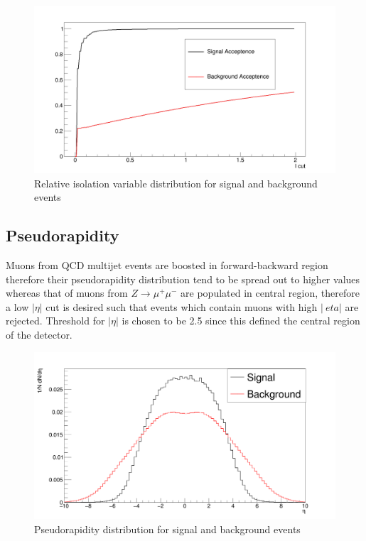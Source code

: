 \documentclass[12pt,a4paper]{article}		%
\begin{document}
\begin{figure}[h]
	\begin{center}
		\includegraphics[scale=0.2]{Iacc.png} 
		\caption{Relative isolation variable distribution for signal and background events} 		
	\end{center}
	\centering	
\end{figure}
		

\newpage			
\subsection{Pseudorapidity}  

Muons from QCD multijet events are boosted in forward-backward region therefore their pseudorapidity distribution tend to be spread out to higher values whereas that of muons from $Z \to \mu^+ \mu^-$ are populated in central region, therefore a low $|\eta|$ cut is desired such that events which contain muons with high $|\	eta| $ are rejected. Threshold for $|\eta|$ is chosen to be 2.5 since this defined the central region of the detector.    

\begin{figure}[h]
	\begin{center}
		\includegraphics[scale=0.2]{etasvsbkg.png} 
		\caption{Pseudorapidity distribution for signal and background events}		
	\end{center}
	\centering	
\end{figure}						    
\end{document}
